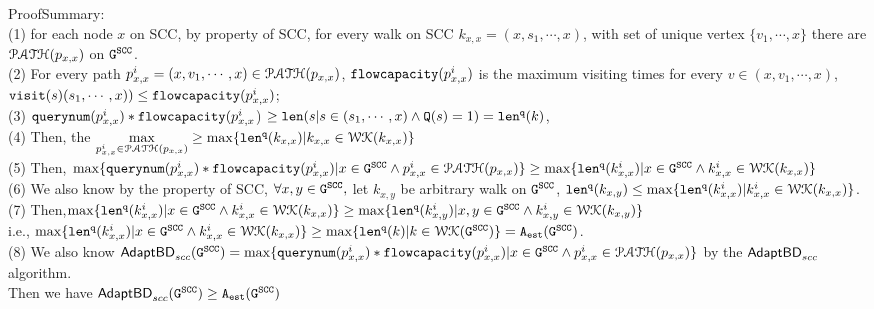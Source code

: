 ProofSummary:
\\
(1) for each node $x$ on SCC, by property of SCC, 
for every walk on SCC $k_{x, x} = (x, s_1, \cdots, x)$,
with set of unique vertex $\{v_1, \cdots, x\}$
there are $\mathcal{PATH}(p_{x,x})$ on $\mathtt{G^{SCC}}$.
\\
(2) For every path $p_{x,x}^{i} = (x, v_1, \cdots, x) \in \mathcal{PATH}(p_{x,x})$,  
$\mathtt{flowcapacity} (p_{x,x}^{i})$ is the maximum visiting times for every $v \in (x, v_1, \cdots, x)$, 
$\mathtt{visit}(s) (s_1, \cdots, x)) \leq \mathtt{flowcapacity}(p_{x,x}^{i})$;
\\
(3) $\mathtt{querynum}(p_{x,x}^{i})  * \mathtt{flowcapacity}(p_{x,x}^{i}$)  $\geq\mathtt{len}(s | s \in ( s_1, \cdots, x) \land \mathtt{Q}(s) = 1) =  \mathtt{len}^{\tt q}(k)$,
\\
(4) Then, the $\max\limits_{p_{x,x}^{i} \in \mathcal{PATH}(p_{x,x})} \geq \max\{\mathtt{len}^{\tt q}(k_{x, x}) | k_{x, x} \in \mathcal{WK}(k_{x, x})\}$
\\
(5) Then,  $\max\{\mathtt{querynum}(p_{x,x}^{i})  * \mathtt{flowcapacity}(p_{x,x}^{i}) | x \in \mathtt{G^{SCC}} \land {p_{x,x}^{i} \in \mathcal{PATH}(p_{x,x})} \} 
\geq \max\{\mathtt{len}^{\tt q}(k_{x, x}^i) |x \in \mathtt{G^{SCC}} \land  k_{x, x}^i \in \mathcal{WK}(k_{x, x})\}$
\\
(6) We also know by the property of SCC, $\forall x, y \in \mathtt{G^{SCC}}, $ let $k_{x, y}$ be arbitrary walk on $\mathtt{G^{SCC}}$,
 $\mathtt{len}^{\tt q}(k_{x, y}) \leq \max\{\mathtt{len}^{\tt q}(k_{x, x}^i) | k_{x, x}^i \in \mathcal{WK}(k_{x, x})\}$.
\\
(7) Then,$ \max\{\mathtt{len}^{\tt q}(k_{x, x}^i) |x \in \mathtt{G^{SCC}} \land  k_{x, x}^i \in \mathcal{WK}(k_{x, x})\} \geq  \max\{\mathtt{len}^{\tt q}(k_{x, y}^i) |x, y \in \mathtt{G^{SCC}} \land  k_{x, y}^i \in \mathcal{WK}(k_{x, y})\}$
\\
i.e., 
$ \max\{\mathtt{len}^{\tt q}(k_{x, x}^i) |x \in \mathtt{G^{SCC}} \land  k_{x, x}^i \in \mathcal{WK}(k_{x, x})\} \geq  \max\{\mathtt{len}^{\tt q}(k) | k\in \mathcal{WK}(\mathtt{G^{SCC}})\} = {\mathtt{A_{est}}}(\mathtt{G^{SCC}})$.
\\
(8) We also know 
$\mathsf{AdaptBD}_{scc}(\mathtt{G^{SCC}}) = \max\{\mathtt{querynum}(p_{x,x}^{i})  * \mathtt{flowcapacity}(p_{x,x}^{i}) | x \in \mathtt{G^{SCC}} \land {p_{x,x}^{i} \in \mathcal{PATH}(p_{x,x})} \} $ by the $\mathsf{AdaptBD}_{scc}$ algorithm.
\\
Then we have
$\mathsf{AdaptBD}_{scc}(\mathtt{G^{SCC}}) \geq {\ensuremath{\mathtt{A_{est}}}}(\mathtt{G^{SCC}})$
\\
